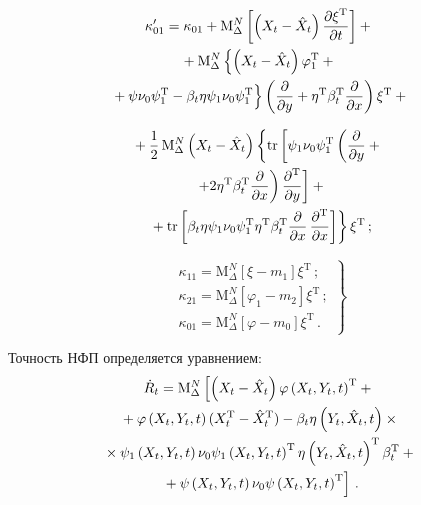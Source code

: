 \begin{multicols}{2}
\noindent
\begin{multline*}
   \kappa_{01}' =\kappa_{01} + \mathrm{M}^N_\Delta  \left[ \left(X_t-\hat{X}_t\right)  \fr{\partial \xi^{\mathrm{T}}}{\partial t} \right]+{}\\
   {}+
     \mathrm{M}^N_\Delta \left\{ \left(X_t-\hat{X}_t\right) \varphi_1^{\mathrm{T}} +{}\right.\\
\left.{}+\psi\nu_0\psi_1^{\mathrm{T}} - \beta_t\eta\psi_1\nu_0\psi_1^{\mathrm{T}}
\vphantom{\left(X_t-\hat{X}_t\right)}
\right\} \left(
    \fr{\partial}{\partial y}+\eta^{\mathrm{T}}\beta_t^{\mathrm{T}} \fr{\partial } {\partial x}\right)\xi^{\mathrm{T}}+{}
    \end{multline*}

    \noindent
    \begin{multline}
{}+\displaystyle\frac{\displaystyle 1\mathstrut}{\displaystyle 2\mathstrut}\, \mathrm{M}^N_\Delta \left(X_t-\hat{X}_t\right) \left\{ \mathrm{tr} \left[ \psi_1\nu_0\psi_1^{\mathrm{T}}
    \left( \displaystyle\frac{\displaystyle \partial\mathstrut}{\displaystyle \partial y\mathstrut}+{}\right.\right.\right.\\
    {}\left.\left.+2 \eta^{\mathrm{T}}\beta_t^{\mathrm{T}} \displaystyle\frac{\displaystyle \partial\mathstrut}{\displaystyle \partial x\mathstrut}\right)
\displaystyle\frac{\displaystyle \partial^{\mathrm{T}}\mathstrut}{\displaystyle \partial y\mathstrut}\right]+{}\\
\left.{}+\mathrm{tr}\left[ \beta_t\eta\psi_1\nu_0\psi_1^{\mathrm{T}}\eta^{\mathrm{T}}\beta_t^{\mathrm{T}} \displaystyle\frac{\displaystyle \partial\mathstrut}{\displaystyle \partial x\mathstrut}\,
\displaystyle\frac{\displaystyle \partial^{\mathrm{T}}\mathstrut}{\displaystyle \partial x\mathstrut}\right]\right\} \xi^{\mathrm{T}} \,;\label{e16-sin}
\end{multline}


\noindent
\begin{equation}
\left.
\begin{array}{c}
 \kappa_{11} = \mathrm{M}^N_\Delta \left[ \xi - m_1\right] \xi^{\mathrm{T}}\,;\\[6pt]
 \kappa_{21} = \mathrm{M}^N_\Delta \left[ \varphi_1  - m_2\right] \xi^{\mathrm{T}} \,;\\[6pt]
 \kappa_{01} = \mathrm{M}^N_\Delta \left[ \varphi  - m_0\right] \xi^{\mathrm{T}} \,.
 \end{array}
 \right\}
 \label{e17-sin}
 \end{equation}

Точность НФП определяется уравнением:
      \begin{multline}
      \dot R_t = \mathrm{M}^N_\Delta \left[\left( X_t -\hat{X}_t\right) \varphi \left(X_t,Y_t, t\right)^{\mathrm{T}} +{}\right.\\
      {}+\varphi\left(X_t,Y_t, t\right) (X_t^{\mathrm{T}} -\hat{X}_t^{\mathrm{T}})-\beta_t \eta \left(Y_t, {\hat X}_t,t\right) \times{}\\
      {}\times \psi_1 \left(X_t,Y_t, t\right) \nu_0 \psi_1\left(X_t,Y_t, t\right)^{\mathrm{T}} \eta \left(Y_t, {\hat X}_t,t\right)^{\mathrm{T}} \beta_t^{\mathrm{T}} +{}\\
   \left. {}+\psi \left(X_t,Y_t, t\right) \nu_0 \psi \left(X_t,Y_t, t\right)^{\mathrm{T}}\right]\,.
   \label{e18-sin}
   \end{multline}


\end{multicols}
